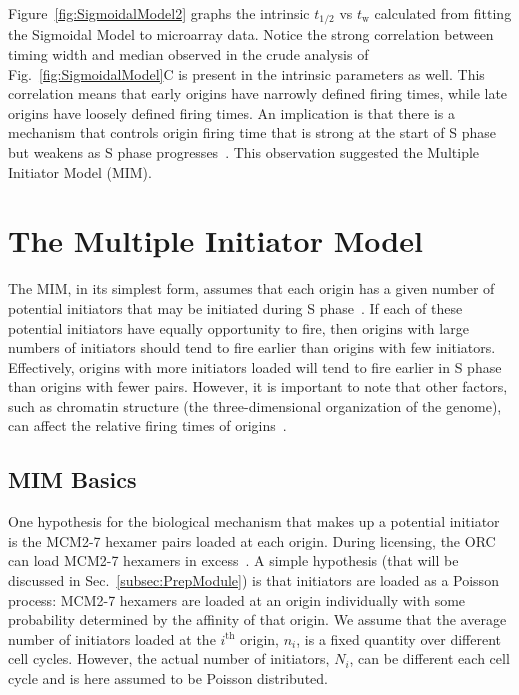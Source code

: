 {	Figure~\ref{fig:SigmoidalModel2} graphs the intrinsic $t_{1/2}$ vs $t_{\text{w}}$ calculated from fitting the Sigmoidal Model to microarray data.
	Notice the strong correlation between timing width and median observed in the crude analysis of Fig.~\ref{fig:SigmoidalModel}C is present in the intrinsic parameters as well.
	This correlation means that early origins have narrowly defined firing times, while late origins have loosely defined firing times.
	An implication is that there is a mechanism that controls origin firing time that is strong at the start of S phase but weakens as S phase progresses~\cite{ScottsThesis}.
	This observation suggested the Multiple Initiator Model (MIM).
	
	
	
	\section{The Multiple Initiator Model}
	\label{sec:MIM}
	
	The MIM, in its simplest form, assumes that each origin has a given number of potential initiators that may be initiated during S phase~\cite{ScottsThesis}.
	If each of these potential initiators have equally opportunity to fire, then origins with large numbers of initiators should tend to fire earlier than origins with few initiators.
	Effectively, origins with more initiators loaded will tend to fire earlier in S phase than origins with fewer pairs.
	However, it is important to note that other factors, such as chromatin structure (the three-dimensional organization of the genome), can affect the relative firing times of origins~\cite{Chromatin}.
	
		\subsection{MIM Basics}
		\label{subsec:MIMBasics}
		
		One hypothesis for the biological mechanism that makes up a potential initiator is the MCM2-7 hexamer pairs loaded at each origin.
		During licensing, the ORC can load MCM2-7 hexamers in excess~\cite{MultiMCM}.
		A simple hypothesis (that will be discussed in Sec.~\ref{subsec:PrepModule}) is that initiators are loaded as a Poisson process:
		MCM2-7 hexamers are loaded at an origin individually with some probability determined by the affinity of that origin.
		We assume that the average number of initiators loaded at the $i^{\text{th}}$ origin, $n_i$, is a fixed quantity over different cell cycles.
		However, the actual number of initiators, $N_i$, can be different each cell cycle and is here assumed to be Poisson distributed.
		
}
